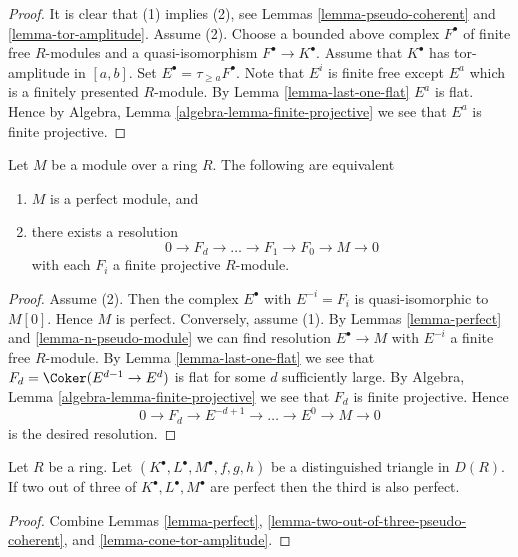 \begin{proof}
It is clear that (1) implies (2), see
Lemmas \ref{lemma-pseudo-coherent} and \ref{lemma-tor-amplitude}.
Assume (2). Choose a bounded above complex $F^\bullet$
of finite free $R$-modules and a quasi-isomorphism $F^\bullet \to K^\bullet$.
Assume that $K^\bullet$ has tor-amplitude in $[a, b]$.
Set $E^\bullet = \tau_{\geq a}F^\bullet$. Note that $E^i$ is finite free
except $E^a$ which is a finitely presented $R$-module.
By
Lemma \ref{lemma-last-one-flat}
$E^a$ is flat. Hence by
Algebra, Lemma \ref{algebra-lemma-finite-projective}
we see that $E^a$ is finite projective.
\end{proof}

\begin{lemma}
\label{lemma-perfect-module}
Let $M$ be a module over a ring $R$. The following are equivalent
\begin{enumerate}
\item $M$ is a perfect module, and
\item there exists a resolution
$$
0 \to F_d \to \ldots \to F_1 \to F_0 \to M \to 0
$$
with each $F_i$ a finite projective $R$-module.
\end{enumerate}
\end{lemma}

\begin{proof}
Assume (2). Then the complex $E^\bullet$ with $E^{-i} = F_i$
is quasi-isomorphic to $M[0]$. Hence $M$ is perfect.
Conversely, assume (1). By
Lemmas \ref{lemma-perfect} and \ref{lemma-n-pseudo-module}
we can find resolution $E^\bullet \to M$ with $E^{-i}$ a finite free
$R$-module. By
Lemma \ref{lemma-last-one-flat}
we see that $F_d = \Coker(E^{d - 1} \to E^d)$ is flat for
some $d$ sufficiently large. By
Algebra, Lemma \ref{algebra-lemma-finite-projective}
we see that $F_d$ is finite projective.
Hence
$$
0 \to F_d \to E^{-d+1} \to \ldots \to E^0 \to M \to 0
$$
is the desired resolution.
\end{proof}

\begin{lemma}
\label{lemma-two-out-of-three-perfect}
Let $R$ be a ring. Let $(K^\bullet, L^\bullet, M^\bullet, f, g, h)$
be a distinguished triangle in $D(R)$. If two out of three of
$K^\bullet, L^\bullet, M^\bullet$ are
perfect then the third is also perfect.
\end{lemma}

\begin{proof}
Combine
Lemmas \ref{lemma-perfect}, \ref{lemma-two-out-of-three-pseudo-coherent}, and
\ref{lemma-cone-tor-amplitude}.
\end{proof}


